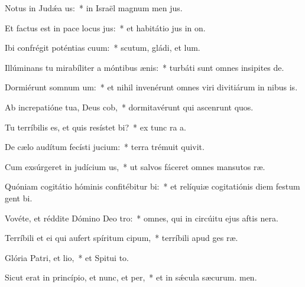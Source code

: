 \item Notus in Judǽa us:~* in Israël magnum men jus.
\item Et factus est in pace locus jus:~* et habitátio jus in on.
\item Ibi confrégit poténtias cuum:~* scutum, gládi, et lum.
\item Illúminans tu mirabíliter a móntibus ænis:~* turbáti sunt omnes insipites de.
\item Dormiérunt somnum um:~* et nihil invenérunt omnes viri divitiárum in nibus is.
\item Ab increpatióne tua, Deus cob,~* dormitavérunt qui ascenrunt quos.
\item Tu terríbilis es, et quis resístet bi?~* ex tunc ra a.
\item De cælo audítum fecísti jucium:~* terra trémuit  quivit.
\item Cum exsúrgeret in judícium us,~* ut salvos fáceret omnes mansutos ræ.
\item Quóniam cogitátio hóminis confitébitur bi:~* et relíquiæ cogitatiónis diem festum gent bi.
\item Vovéte, et réddite Dómino Deo tro:~* omnes, qui in circúitu ejus aftis nera.
\item Terríbili et ei qui aufert spíritum cipum,~* terríbili apud ges ræ.
\item Glória Patri, et lio,~* et Spitui to.
\item Sicut erat in princípio, et nunc, et per,~* et in sǽcula sæcurum. men.
